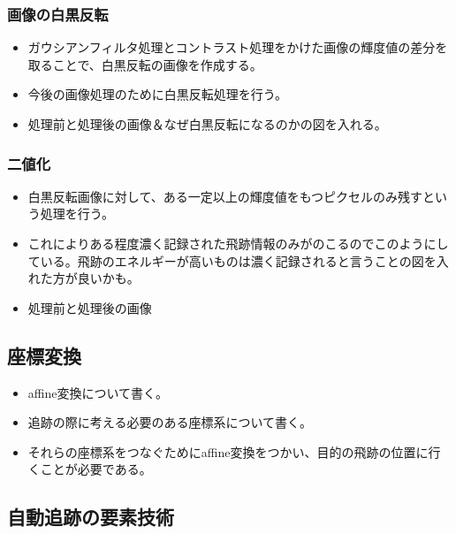 \documentclass[12pt,a4paper]{jarticle}
\begin{document}
\subsubsection{画像の白黒反転}
\begin{itemize}
    \item ガウシアンフィルタ処理とコントラスト処理をかけた画像の輝度値の差分を取ることで、白黒反転の画像を作成する。
    \item 今後の画像処理のために白黒反転処理を行う。
    \item 処理前と処理後の画像＆なぜ白黒反転になるのかの図を入れる。
\end{itemize}
\subsubsection{二値化}
\begin{itemize}
    \item 白黒反転画像に対して、ある一定以上の輝度値をもつピクセルのみ残すという処理を行う。
    \item これによりある程度濃く記録された飛跡情報のみがのこるのでこのようにしている。飛跡のエネルギーが高いものは濃く記録されると言うことの図を入れた方が良いかも。
    \item 処理前と処理後の画像
\end{itemize}
\subsection{座標変換}
\begin{itemize}
    \item affine変換について書く。
    \item 追跡の際に考える必要のある座標系について書く。
    \item それらの座標系をつなぐためにaffine変換をつかい、目的の飛跡の位置に行くことが必要である。
\end{itemize}
\subsection{自動追跡の要素技術}
\end{document}
